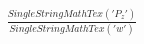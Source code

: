 \documentclass[preview]{standalone}
\begin{document}
\begin{align*}
\frac{SingleStringMathTex('P_z')}{SingleStringMathTex('w')}
\end{align*}
\end{document}
